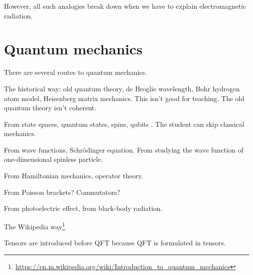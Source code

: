 However, all such analogies break down when we have to explain electromagnetic radiation.

\section{Quantum mechanics}

There are several routes to quantum mechanics.

The historical way:
old quantum theory, de Broglie wavelength, Bohr hydrogen atom model, Heisenberg matrix mechanics.
This isn't good for teaching.
The old quantum theory isn't coherent.

From state spaces, quantum states, spins, qubits \cite{susskind2014quantum}.
The student can skip classical mechanics.

From wave functions, Schr\"odinger equation.
From studying the wave function of one-dimensional spinless particle.

From Hamiltonian mechanics, operator theory.

From Poisson brackets? Commutators?

From photoelectric effect, from black-body radiation.

The Wikipedia way\footnote{\url{https://en.m.wikipedia.org/wiki/Introduction_to_quantum_mechanics}}

Tensors are introduced before QFT because QFT is formulated in tensors.
